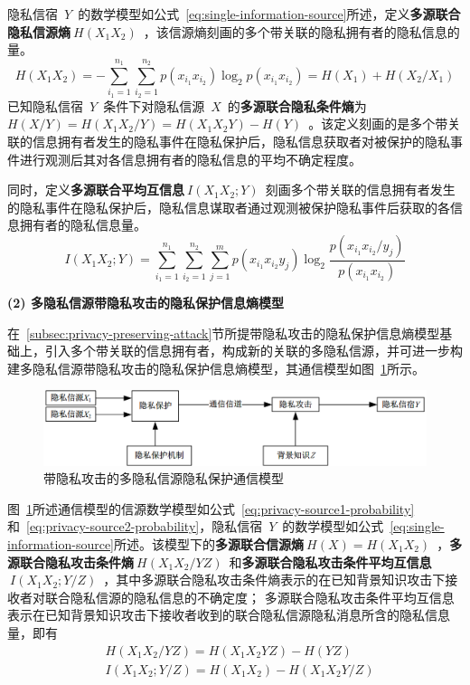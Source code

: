 隐私信宿~$Y$~的数学模型如公式~\ref{eq:single-information-source}所述，定义\textbf{多源联合隐私信源熵}$~H(X_{1}X_{2})$~，该信源熵刻画的多个带关联的隐私拥有者的隐私信息的量。
\begin{equation}
H(X_{1}X_{2}) = -\sum_{i_{1}=1}^{n_{1}}\sum_{i_{2}=1}^{n_{2}}p(x_{i_{1}}x_{i_{2}})\log_{2}p(x_{i_{1}}x_{i_{2}})=H(X_{1})+H(X_{2}/X_{1})
\end{equation}
已知隐私信宿~$Y$~条件下对隐私信源~$X$~的\textbf{多源联合隐私条件熵}为~$H(X/Y)=H(X_{1}X_{2}/Y)=H(X_{1}X_{2}Y)-H(Y)$~。该定义刻画的是多个带关联的信息拥有者发生的隐私事件在隐私保护后，隐私信息获取者对被保护的隐私事件进行观测后其对各信息拥有者的隐私信息的平均不确定程度。

同时，定义\textbf{多源联合平均互信息}$~I(X_{1}X_{2};Y)$~刻画多个带关联的信息拥有者发生的隐私事件在隐私保护后，隐私信息谋取者通过观测被保护隐私事件后获取的各信息拥有者的隐私信息量。
\begin{equation}
I(X_{1}X_{2};Y)=\sum_{i_{1}=1}^{n_{1}}\sum_{i_{2}=1}^{n_{2}}\sum_{j=1}^{m}p(x_{i_{1}}x_{i_{2}}y_{j})\log_{2}\frac{p(x_{i_{1}}x_{i_{2}}/y_{j})}{p(x_{i_{1}}x_{i_{2}})}
\end{equation}

\textbf{(2) 多隐私信源带隐私攻击的隐私保护信息熵模型}

在~\ref{subsec:privacy-preserving-attack}节所提带隐私攻击的隐私保护信息熵模型基础上，引入多个带关联的信息拥有者，构成新的关联的多隐私信源，并可进一步构建多隐私信源带隐私攻击的隐私保护信息熵模型，其通信模型如图~\ref{fig:Communication-Model-for-Privacy-of-Multi-Source-attacks}所示。

\begin{figure}[htbp]
	\centering
	\includegraphics[width = 0.95\linewidth]{./figures/Communication-Model-for-Privacy-of-Multi-Source-attacks.png}
	\caption{带隐私攻击的多隐私信源隐私保护通信模型}
	\label{fig:Communication-Model-for-Privacy-of-Multi-Source-attacks}
\end{figure}

图~\ref{fig:Communication-Model-for-Privacy-of-Multi-Source-attacks}所述通信模型的信源数学模型如公式~\ref{eq:privacy-source1-probability}和~\ref{eq:privacy-source2-probability}，隐私信宿~$Y$~的数学模型如公式~\ref{eq:single-information-source}所述。该模型下的\textbf{多源联合信源熵}$~H(X)=H(X_{1}X_{2})$~，\textbf{多源联合隐私攻击条件熵}$~H(X_{1}X_{2}/YZ)$~和\textbf{多源联合隐私攻击条件平均互信息}$~I(X_{1}X_{2};Y/Z)$~，其中多源联合隐私攻击条件熵表示的在已知背景知识攻击下接收者对联合隐私信源的隐私信息的不确定度； 多源联合隐私攻击条件平均互信息表示在已知背景知识攻击下接收者收到的联合隐私信源隐私消息所含的隐私信息量，即有
\begin{equation}
\begin{split}
&H(X_{1}X_{2}/YZ)=H(X_{1}X_{2}YZ)-H(YZ)\\
&I(X_{1}X_{2};Y/Z)=H(X_{1}X_{2})-H(X_{1}X_{2}Y/Z)
\end{split}
\end{equation}

